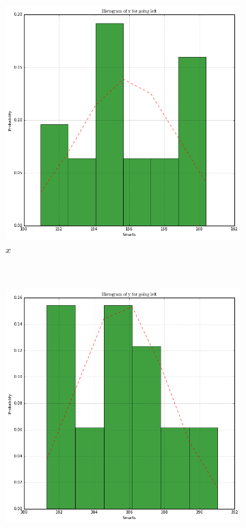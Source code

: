 \documentclass[paper=a4, fontsize=11pt]{scrartcl} %
\begin{document}
\begin{figure}[h!]
    \centering
    \begin{subfigure}[b]{0.3\textwidth}
        \setlength{\fboxsep}{0.5pt} %
        \setlength{\fboxrule}{0.5pt}
        \includegraphics[width=\textwidth,fbox]{images/histogram_4_x_left.png}
        \caption{$x$}
    \end{subfigure}
    ~
    \begin{subfigure}[b]{0.3\textwidth}
        \setlength{\fboxsep}{0.5pt} %
        \setlength{\fboxrule}{0.5pt}
        \includegraphics[width=\textwidth,fbox]{images/histogram_4_y_left.png}

\end{subfigure}
\end{figure}
\end{document}
